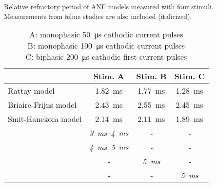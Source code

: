 \begin{table}[htb]
\centering
\caption{Relative refractory period of ANF models measured with four stimuli. Measurements from feline studies are also included (italicized).}
\begin{tabular}{l|ccc}
& Stim. A & Stim. B & Stim. C\\\hline
Rattay model & \SI{1.82}{\milli\second} & \SI{1.77}{\milli\second} & \SI{1.28}{\milli\second}\\
Briaire-Frijns model & \SI{2.43}{\milli\second} & \SI{2.55}{\milli\second} & \SI{2.45}{\milli\second}\\
Smit-Hanekom model & \SI{2.14}{\milli\second} & \SI{2.11}{\milli\second} & \SI{1.89}{\milli\second}\\
\textit{\cite{Stypulkowski1984}} & \textit{\SIrange{3}{4}{\milli\second}} & \textit{-} & \textit{-}\\
\textit{\cite{Cartee2000}} & \textit{\SIrange{4}{5}{\milli\second}} & \textit{-} & \textit{-}\\
\textit{\cite{Dynes1996}} & \textit{-} & \textit{\SI{5}{\milli\second}} & \textit{-}\\
\textit{\cite{Hartmann1984a}} & \textit{-} & \textit{-} & \textit{\SI{5}{\milli\second}}\\
\hline
\end{tabular}
\caption*{A: monophasic \SI{50}{\micro\second} cathodic current pulses\\
B: monophasic \SI{100}{\micro\second} cathodic current pulses\\
C: biphasic \SI{200}{\micro\second} cathodic first current pulses\\
}
\label{tbl:RRP_comparison}
\end{table}
